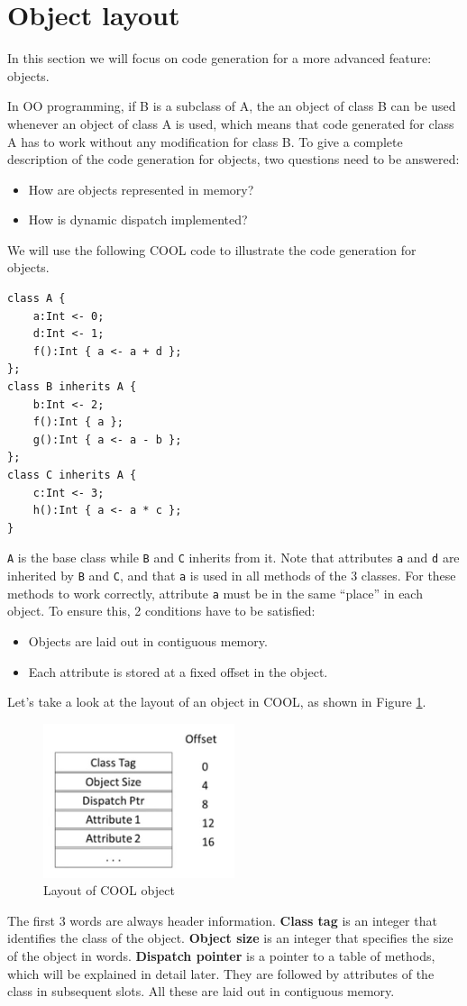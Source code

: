 \section{Object layout}
In this section we will focus on code generation for a more advanced feature: objects.

In OO programming, if B is a subclass of A, the an object of class B can be used whenever an object of class A is used, which means that code generated for class A has to work without any modification for class B. To give a complete description of the code generation for objects, two questions need to be answered:
\begin{itemize}
\item How are objects represented in memory?
\item How is dynamic dispatch implemented?
\end{itemize}
We will use the following COOL code to illustrate the code generation for objects.
\begin{lstlisting}
class A {
	a:Int <- 0;
	d:Int <- 1;
	f():Int { a <- a + d };
};
class B inherits A {
	b:Int <- 2;
	f():Int { a };
	g():Int { a <- a - b };
};
class C inherits A {
	c:Int <- 3;
	h():Int { a <- a * c };
}
\end{lstlisting}

\texttt{A} is the base class while \texttt{B} and \texttt{C} inherits from it. Note that attributes \texttt{a} and \texttt{d} are inherited by \texttt{B} and \texttt{C}, and that \texttt{a} is used in all methods of the 3 classes. For these methods to work correctly, attribute \texttt{a} must be in the same ``place'' in each object. To ensure this, 2 conditions have to be satisfied: 
\begin{itemize}
\item Objects are laid out in contiguous memory.
\item Each attribute is stored at a fixed offset in the object. 
\end{itemize}
Let's take a look at the layout of an object in COOL, as shown in Figure \ref{coolobjlayout}. 
\begin{figure}[ht]
\centering
\includegraphics[width=0.5\textwidth]{coolobjlayout.jpg}
\caption{Layout of COOL object}\label{coolobjlayout}
\end{figure}
The first 3 words are always header information. \textbf{Class tag} is an integer that identifies the class of the object. \textbf{Object size} is an integer that specifies the size of the object in words. \textbf{Dispatch pointer} is a pointer to a table of methods, which will be explained in detail later. They are followed by attributes of the class in subsequent slots. All these are laid out in contiguous memory. 

